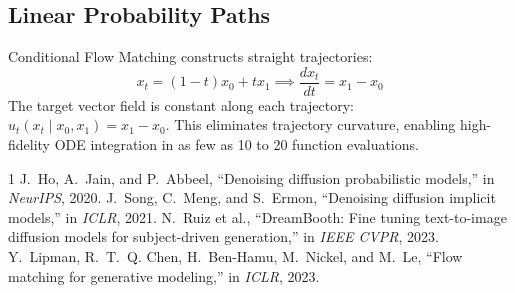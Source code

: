 \documentclass[10pt,journal,compsoc]{IEEEtran}
\begin{document}
\subsection{Linear Probability Paths}
Conditional Flow Matching constructs straight trajectories:
\begin{equation}
x_t = (1 - t) x_0 + t x_1 \implies \frac{d x_t}{dt} = x_1 - x_0
\end{equation}
The target vector field is constant along each trajectory: $u_t(x_t \mid x_0, x_1) = x_1 - x_0$. This eliminates trajectory curvature, enabling high-fidelity ODE integration in as few as 10 to 20 function evaluations.


\begin{thebibliography}{1}
J.~Ho, A.~Jain, and P.~Abbeel, ``Denoising diffusion probabilistic models,'' in \emph{NeurIPS}, 2020.
J.~Song, C.~Meng, and S.~Ermon, ``Denoising diffusion implicit models,'' in \emph{ICLR}, 2021.
N.~Ruiz et al., ``DreamBooth: Fine tuning text-to-image diffusion models for subject-driven generation,'' in \emph{IEEE CVPR}, 2023.
Y.~Lipman, R.~T.~Q. Chen, H.~Ben-Hamu, M.~Nickel, and M.~Le, ``Flow matching for generative modeling,'' in \emph{ICLR}, 2023.
\end{thebibliography}
\end{document}
